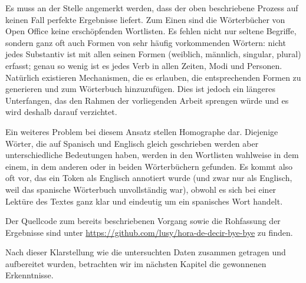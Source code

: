 Es muss an der Stelle angemerkt werden, dass der oben beschriebene Prozess auf keinen Fall perfekte Ergebnisse liefert.
Zum Einen sind die Wörterbücher von Open Office keine erschöpfenden Wortlisten.
Es fehlen nicht nur seltene Begriffe, sondern ganz oft auch Formen von sehr häufig vorkommenden Wörtern:
nicht jedes Substantiv ist mit allen seinen Formen (weiblich, männlich, singular, plural) erfasst;
genau so wenig ist es jedes Verb in allen Zeiten, Modi und Personen.
Natürlich existieren Mechanismen, die es erlauben, die entsprechenden Formen zu generieren und zum Wörterbuch hinzuzufügen.
Dies ist jedoch ein längeres Unterfangen, das den Rahmen der vorliegenden Arbeit sprengen würde und es wird deshalb darauf verzichtet.

Ein weiteres Problem bei diesem Ansatz stellen Homographe dar.
Diejenige Wörter, die auf Spanisch und Englisch gleich geschrieben werden aber unterschiedliche Bedeutungen haben, werden in den Wortlisten wahlweise in dem einem, in dem anderen oder in beiden Wörterbüchern gefunden.
Es kommt also oft vor, das ein Token als Englisch annotiert wurde (und zwar nur als Englisch, weil das spanische Wörterbuch unvollständig war), obwohl es sich bei einer Lektüre des Textes ganz klar und eindeutig um ein spanisches Wort handelt.

Der Quellcode zum bereits beschriebenen Vorgang sowie die Rohfassung der Ergebnisse sind unter \url{https://github.com/lusy/hora-de-decir-bye-bye} zu finden.

Nach dieser Klarstellung wie die untersuchten Daten zusammen getragen und aufbereitet wurden, betrachten wir im nächsten Kapitel die gewonnenen Erkenntnisse.

